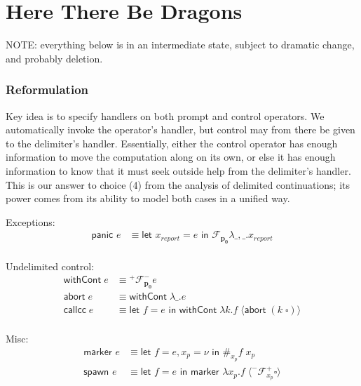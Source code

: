 \documentclass[11pt]{article}
\newcommand{\maybePage}{\newpage}
\newcommand\x{\lambda x}
\newcommand{\letin}[2]{\textsf{let }#1\textsf{ in }#2}
\newcommand\F{\mathcal{F}}
\newcommand{\angles}[1]{\langle#1\rangle}
\begin{document}
\maybePage
\part{Here There Be Dragons}

NOTE: everything below is in an intermediate state, subject to dramatic change, and probably deletion.



\section{Reformulation}

Key idea is to specify handlers on both prompt and control operators.
We automatically invoke the operator's handler, but control may from there be given to the delimiter's handler.
Essentially, either the control operator has enough information to move the computation along on its own, or else it has enough information to know that it must seek outside help from the delimiter's handler.
This is our answer to choice (4) from the analysis of delimited continuations; its power comes from its ability to model both cases in a unified way.


Exceptions:
\begin{align*}
\textsf{panic }e &\equiv
	\letin{x_{report} = e}{\F_\mathbf{p_0}\lambda \_,\_.x_{report}}
	\\
\end{align*}

Undelimited control:
\begin{align*}
\textsf{withCont}\;e &\equiv
	{}^+\F^-_\mathbf{p_0}e
	\\
\textsf{abort}\;e &\equiv
	\textsf{withCont}\;\lambda \_.e
	\\
\textsf{callcc}\;e &\equiv
	\letin{f=e}{\textsf{withCont}\;\lambda k. f\; \angles{\textsf{abort}\;(k\;\square)}}
	\\
\end{align*}

Misc:
\begin{align*}
\textsf{marker }e &\equiv
	\letin{f=e, x_p=\nu}{\#_{x_p}f\;x_p} \\
\textsf{spawn }e &\equiv
	\letin{f=e}{\textsf{marker }\x_p.f\;\angles{^-\F^+_{x_p}\square}}
	\\
\end{align*}


\end{document}
